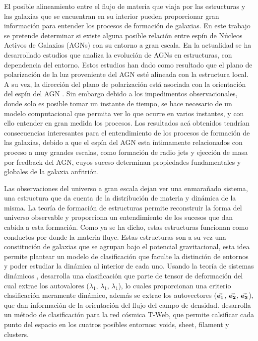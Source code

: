 El posible alineamiento entre el flujo de materia que viaja por las estructuras y las galaxias que se encuentran en su interior pueden proporcionar gran información para entender los procesos de formación de galaxias. En este trabajo se pretende determinar si existe alguna posible relación entre espín de Núcleos Activos de Galaxias (AGNs) con su entorno a gran escala. En la actualidad se ha desarrollado estudios que analiza la evolución de AGNs en estructuras, con dependencia del entorno. Estos estudios han dado como resultado que el plano de polarización de la luz proveniente del AGN esté alineada con la estructura local. A su vez, la dirección del plano de polarización está asociada con la orientación del espín del AGN \cite{hutsemekers2014}. Sin embargo debido a los impedimentos observacionales, donde solo es posible tomar un instante de tiempo, se hace necesario de un modelo computacional que permita ver lo que ocurre en varios instantes, y con ello entender en gran medida los procesos. Los resultados acá obtenidos tendrían consecuencias interesantes para el entendimiento de los procesos de formación de las galaxias, debido a que el espín del AGN esta íntimamente relacionados con proceso a muy grandes escalas, como formación de radio jets y ejección de masa por feedback del AGN, cuyos suceso determinan propiedades fundamentales y globales de la galaxia anfitrión. 


Las observaciones del universo a gran escala dejan ver una enmarañado sistema, una estructura que da cuenta de la distribución de materia y dinámica de la misma. La teoría de formación de estructuras \cite{zeldovich1970} permite reconstruir la forma del universo observable y proporciona un entendimiento de los sucesos que dan cabida a esta formación. Como ya se ha dicho, estas estructuras funcionan como conductos por donde la materia fluye. Estas estructuras son a su vez una constitución de galaxias que se agrupan bajo el potencial gravitacional, esta idea permite plantear un modelo de clasificación que faculte la distinción de entornos y poder estudiar la dinámica al interior de cada uno. Usando la teoría de sistemas dinámicos \cite{hahn2007}, desarrolla una clasificación que parte de tensor de deformación del cual extrae los autovalores ($\lambda_{1}, \, \lambda_{1}, \, \lambda_{1}$), lo cuales proporcionan una criterio clasificación meramente dinámico, además se extrae los autovectores ($\vec{\bf{e_1}}$, $\vec{\bf{e_2}}$, $\vec{\bf{e_3}}$), que dan información de la orientación del flujo del campo de densidad. \cite{forero2009} desarrolla un método de clasificación para la red cósmica T-Web, que permite calsificar cada punto del espacio en los cuatros posibles entornos: voids, sheet, filament y clusters. 

